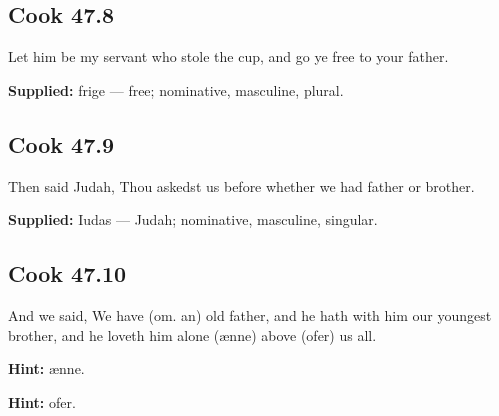 \par\begin{minipage}{\linewidth}\raggedright
\subsection*{Cook 47.8}

Let him be my servant who stole the cup, and go ye free to your father.

\end{minipage}\par\addvspace{4pt}

\textbf{Supplied:} frige — free; nominative, masculine, plural.

\par\begin{minipage}{\linewidth}\raggedright
\subsection*{Cook 47.9}

Then said Judah, Thou askedst us before whether we had father or brother.

\textbf{Supplied:} Iudas — Judah; nominative, masculine, singular.

\end{minipage}\par\addvspace{4pt}

\par\begin{minipage}{\linewidth}\raggedright
\subsection*{Cook 47.10}

And we said, We have (om. an) old father, and he hath with him our youngest brother, and he loveth him alone (ænne) above (ofer) us all.

\textbf{Hint:} ænne.

\textbf{Hint:} ofer.

\end{minipage}\par\addvspace{4pt}

